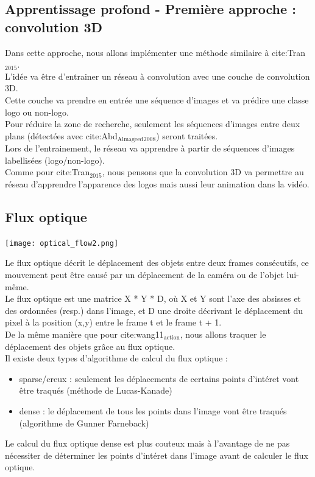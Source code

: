 \documentclass[11pt]{article}
\begin{document}
\subsection{Apprentissage profond - Première approche : convolution 3D}
\label{sec:org452f8dc}
Dans cette approche, nous allons implémenter une méthode similaire à cite:Tran\(_{\text{2015}}\).\\
L'idée va être d'entrainer un réseau à convolution avec une couche de convolution 3D.\\
Cette couche va prendre en entrée une séquence d'images et va prédire une classe logo ou non-logo.\\
Pour réduire la zone de recherche, seulement les séquences d'images entre deux plans (détectées avec cite:Abd\(_{\text{Almageed}}\)\(_{\text{2008}}\)) seront traitées.\\
Lors de l'entrainement, le réseau va apprendre à partir de séquences d'images labellisées (logo/non-logo).\\
Comme pour cite:Tran\(_{\text{2015}}\), nous pensons que la convolution 3D va permettre au réseau d'apprendre l'apparence des logos mais aussi leur animation dans la vidéo.\\
\subsection{Flux optique}
\label{sec:orgd1d3734}
\begin{center}
\texttt{[image: optical\_flow2.png]}
\end{center}
Le flux optique décrit le déplacement des objets entre deux frames consécutifs, ce mouvement peut être causé par un déplacement de la caméra ou de l'objet lui-même.\\
Le flux optique est une matrice X * Y * D, où X et Y sont l'axe des absisses et des ordonnées (resp.) dans l'image, et D une droite décrivant le déplacement du pixel à la position (x,y) entre le frame t et le frame t + 1.\\

De la même manière que pour cite:wang11\(_{\text{action}}\), nous allons traquer le déplacement des objets grâce au flux optique.\\
Il existe deux types d'algorithme de calcul du flux optique :\\
\begin{itemize}
\item sparse/creux : seulement les déplacements de certains points d'intéret vont être traqués (méthode de Lucas-Kanade)\\
\item dense : le déplacement de tous les points dans l'image vont être traqués (algorithme de Gunner Farneback)\\
\end{itemize}
Le calcul du flux optique dense est plus couteux mais à l'avantage de ne pas nécessiter de déterminer les points d'intéret dans l'image avant de calculer le flux optique.\\
\end{document}
